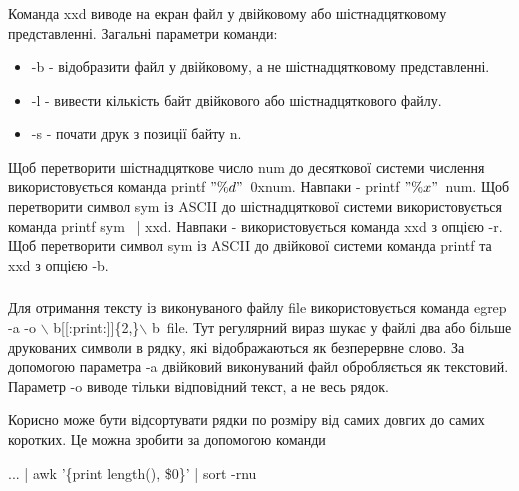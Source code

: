 \documentclass[t]{beamer}  %
\begin{document}
\begin{frame}
 	\frametitle{\insertsection} 
 	\framesubtitle{\insertsubsection}
Команда xxd виводе на екран файл у двійковому або шістнадцятковому представленні. Загальні параметри команди:
\begin{itemize}
   \item  -b - відобразити файл у двійковому, а не шістнадцятковому представленні.
   \item  -l - вивести кількість байт двійкового або шістнадцяткового файлу.
   \item  -s - почати друк з позиції байту n.
 \end{itemize} 

Щоб перетворити шістнадцяткове число num до десяткової системи числення використовується команда printf $"\%d"$~0xnum. Навпаки - printf $"\%x"$~num. Щоб перетворити символ sym із ASCII до шістнадцяткової системи використовується команда printf \textquotesingle sym\textquotesingle ~ | xxd. Навпаки - використовується команда xxd з опцією -r. Щоб перетворити символ sym із ASCII до двійкової системи команда printf та xxd з опцією -b.
 
\end{frame}

\begin{frame}
 	\frametitle{\insertsection} 
 	\framesubtitle{\insertsubsection}
Для отримання тексту із виконуваного файлу file використовується команда egrep -a -o \textquotesingle $\backslash$ b[[:print:]]\{2,\}$\backslash$ b\textquotesingle ~file. Тут регулярний вираз шукає у файлі два або більше друкованих символи в рядку, які відображаються як безперервне слово. За допомогою параметра -a двійковий виконуваний файл обробляється як текстовий. Параметр -o виводе тільки відповідний текст, а не весь рядок. 

Корисно може бути відсортувати рядки по розміру від самих довгих до самих коротких. Це можна зробити за допомогою команди

... | awk '\{print length(), \$0\}' | sort -rnu
\end{frame}
\end{document}
